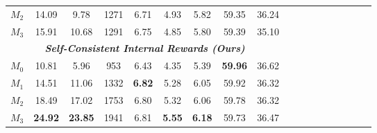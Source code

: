 \begin{table*}[t!]
\begin{tabular}{lccccccccccccccccc}
    $M_2$ & 14.09 & 9.78 & 1271   & 6.71 & 4.93 & 5.82 & 59.35 & 36.24\\
    $M_3$ & 15.91 & 10.68 & 1291 & 6.75 & 4.85 & 5.80 & 59.39 & 35.10\\
    \midrule
    \multicolumn{9}{c}{\textbf{\textit{Self-Consistent Internal Rewards (Ours)}}} \\
    $M_0$ & 10.81 & 5.96 & 953 & 6.43 & 4.35 & 5.39 & \textbf{59.96} & 36.62\\
    $M_1$ & 14.51 & 11.06 & 1332 & \textbf{6.82} & 5.28 & 6.05 & 59.92 &  36.32\\
    $M_2$ & 18.49 & 17.02 & 1753 & 6.80 & 5.32 & 6.06 & 59.78 & 36.32\\
    $M_3$ & \textbf{24.92} & \textbf{23.85} & 1941 & 6.81 & \textbf{5.55 }& \textbf{6.18} & 59.73 & 36.47\\
    \bottomrule
    \end{tabular}
    \vskip -0.1in
\end{table*}



